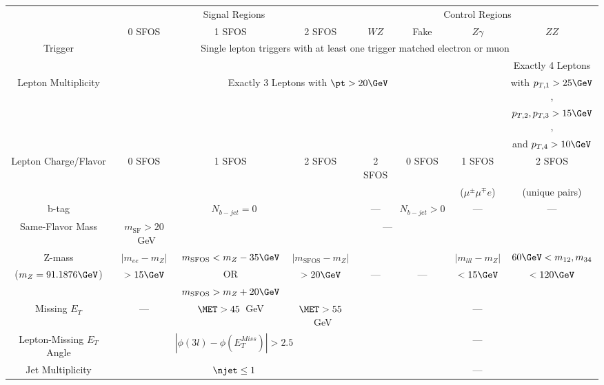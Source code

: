 \begin{tabular}{|c||c||c||c||c||c||c||c|}
\hline
& \multicolumn{3}{c||}{Signal Regions} & \multicolumn{4}{c|}{Control Regions} \\
&  0 SFOS  	& 1 SFOS		  & 2 SFOS  & $WZ$ & Fake & $Z\gamma$ & $ZZ$\\
\hline 
\hline 
Trigger                        & \multicolumn{7}{c|}{Single lepton triggers with at least one trigger matched electron or muon}\\
\hline
& \multicolumn{6}{c||}{} & Exactly 4 Leptons \\
 Lepton Multiplicity& \multicolumn{6}{c||}{Exactly 3 Leptons with $\pt > 20 \GeV$} & with $p_{T,1} > 25 \GeV$,\\
 & \multicolumn{6}{c||}{}& $p_{T,2},p_{T,3} > 15 \GeV$,\\
 & \multicolumn{6}{c||}{}& and $p_{T,4} > 10 \GeV$\\
\hline 
Lepton Charge/Flavor            & 0 SFOS & 1 SFOS & 2 SFOS & 2 SFOS & 0 SFOS & 1 SFOS  & 2 SFOS \\
				&        &        &        &        &        & ($\mu^{\pm} \mu^{\mp} e$) & (unique pairs)\\
\hline
b-tag  & \multicolumn{3}{c||}{$N_{b-jet} = 0$ } &--- & $N_{b-jet} > 0$  &--- & ---\\
\hline 
Same-Flavor Mass &	$m_{\textrm{SF}} > 20$~GeV	& \multicolumn{6}{c|}{---} \\
\hline 
Z-mass                 &  $|m_{ee}-m_Z|$ & $m_{\textrm{SFOS}} < m_{Z}-35\GeV$ & $|m_{\textrm{SFOS}}-m_Z|$  & & & $|m_{lll} - m_Z|$ & $60 \GeV < m_{12},m_{34}$\\
($m_Z = 91.1876\GeV$)  &  $>15\GeV$                                         & OR   &  $>20\GeV$     &--- &--- & $< 15 \GeV$ & $< 120 \GeV$\\ 
                      & 					  & $m_{\textrm{SFOS}}>m_{Z}+20\GeV$	   &  & & & & \\
\hline 
Missing $E_{T}$		& --- 		& $\MET > 45$~GeV & $\MET > 55$~GeV & \multicolumn{4}{c|}{---} \\
\hline 
Lepton-Missing $E_{T}$ Angle 	& 	\multicolumn{3}{c||}{$|\phi(3l)-\phi(E_{T}^{Miss})| > 2.5$}  & \multicolumn{4}{c|}{---}\\
\hline 
Jet Multiplicity& \multicolumn{3}{c||}{$\njet \leq 1$} & \multicolumn{4}{c|}{---}\\
\hline 
\end{tabular}
